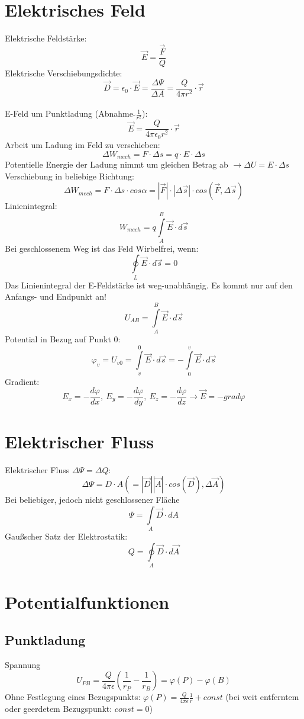 \documentclass[12pt,a4paper]{article}
\begin{document}
\section{Elektrisches Feld}
Elektrische Feldstärke:
\[\vec{E}= \frac{\vec{F}}{Q}\]
Elektrische Verschiebungsdichte:
\[\vec{D} = \epsilon_0 \cdot \vec{E} = \frac{\Delta\Psi}{\Delta A}= \frac{Q}{4\pi r^2}\cdot \vec{r}\]\\
E-Feld um Punktladung (Abnahme $\tilde{} \frac{1}{r^2}$): 
\[\vec{E} = \frac{Q}{4\pi\epsilon_0 r^2} \cdot \vec{r}\]
Arbeit um Ladung im Feld zu verschieben:
\[\Delta W_{mech} = F\cdot\Delta s = q \cdot E \cdot \Delta s\]
Potentielle Energie der Ladung nimmt um gleichen Betrag ab $\rightarrow \Delta U = E\cdot \Delta s$\\
Verschiebung in beliebige Richtung:
\[\Delta W_{mech} = F\cdot \Delta s \cdot cos\alpha = \left|\vec{F}\right| \cdot \left|\Delta\vec{s}\right| \cdot cos (\vec{F}, \Delta\vec{s})\]
Linienintegral:
\[W_{mech} = q\int\limits_A^B{\vec{E} \cdot d\vec{s}}\]
Bei geschlossenem Weg ist das Feld Wirbelfrei, wenn:
\[\oint\limits_ {L}{\vec{E}\cdot d\vec{s}} = 0\]
Das Linienintegral der E-Feldstärke ist weg-unabhängig. Es kommt nur auf den Anfangs- und Endpunkt an!
\[U_{AB} = \int\limits_{A}^B{\vec{E} \cdot d\vec{s}}\]
Potential in Bezug auf Punkt $0$: \[\varphi_v = U_{v0} = \int\limits_v^0{\vec{E}\cdot d\vec{s}} = -\int\limits_0^v{\vec{E}\cdot d\vec{s}}\]
Gradient:
\[E_x = -\frac{d\varphi}{dx},\ E_y = -\frac{d\varphi}{dy},\ E_z = -\frac{d\varphi}{dz} \rightarrow \vec{E} = -grad\varphi\]

\section{Elektrischer Fluss}
Elektrischer Fluss $\Delta \Psi = \Delta Q$: \[\Delta\Psi = D \cdot A ( = \left|\vec{D}\right|\left|\vec{A}\right| \cdot cos(\vec{D}), \Delta\vec{A})\]
Bei beliebiger, jedoch nicht geschlossener Fläche
\[\Psi = \int\limits_A{\vec{D} \cdot dA}\]
Gaußscher Satz der Elektrostatik: 
\[Q = \oint\limits_A{\vec{D} \cdot d\vec{A}}\]


\section{Potentialfunktionen}
\subsection{Punktladung}
Spannung 
\[U_{PB} = \frac{Q}{4\pi\epsilon}(\frac{1}{r_P}-\frac{1}{r_B}) = \varphi(P)-\varphi(B)\]
Ohne Festlegung eines Bezugspunkts: $\varphi(P) = \frac{Q}{4\pi\epsilon}\frac{1}{r} +const$ (bei weit entferntem oder geerdetem Bezugspunkt: $const = 0$)
\end{document}
